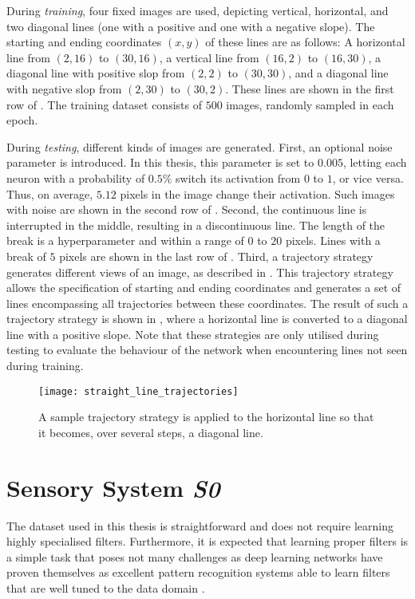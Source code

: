During \emph{training}, four fixed images are used, depicting vertical, horizontal, and two diagonal lines (one with a positive and one with a negative slope). The starting and ending coordinates $(x, y)$ of these lines are as follows: A horizontal line from $(2, 16)$ to $(30, 16)$, a vertical line from $(16, 2)$ to $(16, 30)$, a diagonal line with positive slop from $(2, 2)$ to $(30, 30)$, and a diagonal line with negative slop from $(2, 30)$ to $(30, 2)$. These lines are shown in the first row of .
The training dataset consists of $500$ images, randomly sampled in each epoch.

During \emph{testing}, different kinds of images are generated. 
First, an optional noise parameter is introduced. In this thesis, this parameter is set to $0.005$, letting each neuron with a probability of $0.5\%$ switch its activation from $0$ to $1$, or vice versa. Thus, on average, $5.12$ pixels in the image change their activation. Such images with noise are shown in the second row of .
Second, the continuous line is interrupted in the middle, resulting in a discontinuous line. The length of the break is a hyperparameter and within a range of $0$ to $20$ pixels. Lines with a break of $5$ pixels are shown in the last row of .
Third, a trajectory strategy generates different views of an image, as described in . This trajectory strategy allows the specification of starting and ending coordinates and generates a set of lines encompassing all trajectories between these coordinates.
The result of such a trajectory strategy is shown in , where a horizontal line is converted to a diagonal line with a positive slope. Note that these strategies are only utilised during testing to evaluate the behaviour of the network when encountering lines not seen during training. 

\begin{figure}[h]
    \centering
    \texttt{[image: straight\_line\_trajectories]}
    \caption[Sample line trajectory strategy]{A sample trajectory strategy is applied to the horizontal line so that it becomes, over several steps, a diagonal line.}
\end{figure}


\section{Sensory System \emph{S0}}
The dataset used in this thesis is straightforward and does not require learning highly specialised filters.
Furthermore, it is expected that learning proper filters is a simple task that poses not many challenges as deep learning networks have proven themselves as excellent pattern recognition systems able to learn filters that are well tuned to the data domain .

